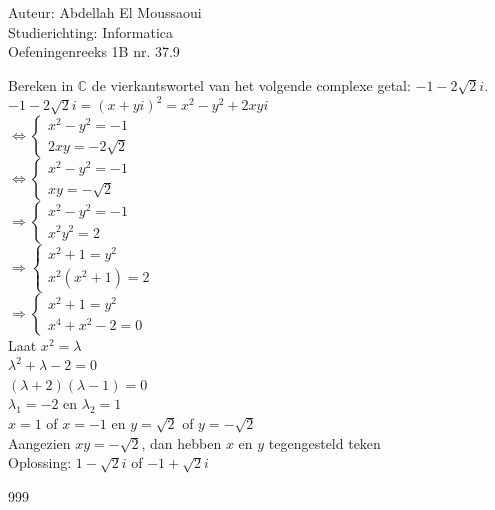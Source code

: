 \documentclass[a4paper]{article}
\begin{document}
  
\noindent \large Auteur: Abdellah El Moussaoui \\
\noindent \large Studierichting: Informatica\\
\noindent \large Oefeningenreeks 1B nr. 37.9\\

\medskip

\normalsize

Bereken in $\mathbb{C}$ de vierkantswortel van het volgende complexe getal: $ -1 - 2\sqrt{2}i $.\\

$ -1 - 2\sqrt{2}i = (x + yi)^2 = x^2 - y^2 + 2xyi $\\

$\Leftrightarrow \left \{
\begin{array}{l}
    x^2 - y^2 = -1 \\
    2xy = -2\sqrt{2}
\end{array}
\right .$\\

$\Leftrightarrow \left \{
\begin{array}{l}
    x^2 - y^2 = -1 \\
    xy = -\sqrt{2}
\end{array}
\right .$\\

$\Rightarrow \left \{
\begin{array}{l}
    x^2 - y^2 = -1 \\
    x^2y^2 = 2
\end{array}
\right .$\\

$\Rightarrow \left \{
\begin{array}{l}
    x^2 +1 = y^2 \\
    x^2(x^2+1) = 2
\end{array}
\right .$\\

$\Rightarrow \left \{
\begin{array}{l}
    x^2 +1 = y^2 \\
    x^4 + x^2 - 2 = 0
\end{array}
\right .$\\

Laat $x^2=\lambda$\\

$ \lambda^2 + \lambda - 2 = 0 $\\

$ (\lambda +2)(\lambda-1)=0 $\\

$ \lambda_1 = -2 $ en $ \lambda_2 = 1 $\\

$ x = 1 $ of $x=-1$ en $ y = \sqrt{2} $ of $y=-\sqrt{2}$\\

Aangezien $xy=-\sqrt{2}$, dan hebben $x$ en $y$ tegengesteld teken\\

Oplossing: $ 1 - \sqrt{2}i $ of $ -1 + \sqrt{2}i $

\begin{thebibliography}{999}
\end{thebibliography}
\end{document}
